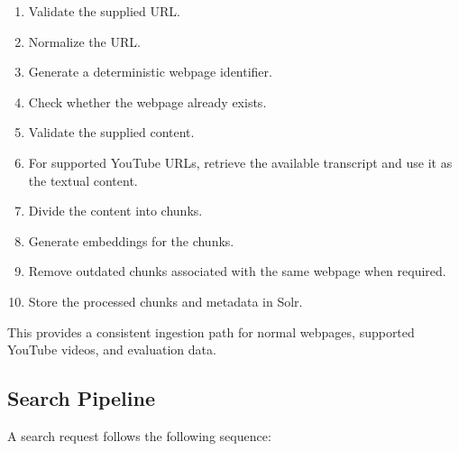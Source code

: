 \documentclass{tietreport}
\begin{document}
\begin{enumerate}

    \item Validate the supplied URL.

    \item Normalize the URL.

    \item Generate a deterministic webpage identifier.

    \item Check whether the webpage already exists.

    \item Validate the supplied content.

    \item For supported YouTube URLs, retrieve the available
    transcript and use it as the textual content.

    \item Divide the content into chunks.

    \item Generate embeddings for the chunks.

    \item Remove outdated chunks associated with the same
    webpage when required.

    \item Store the processed chunks and metadata in Solr.

\end{enumerate}

This provides a consistent ingestion path for normal webpages,
supported YouTube videos, and evaluation data.

\subsection{Search Pipeline}

A search request follows the following sequence:
\end{document}
